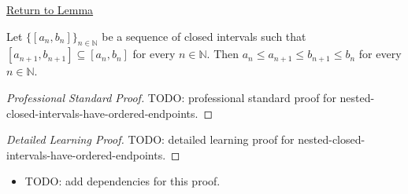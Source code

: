 \newpage
{}
\label{prf:nested-closed-intervals-have-ordered-endpoints}

\begin{remark*}[Return]
\hyperref[lem:nested-closed-intervals-have-ordered-endpoints]{Return to Lemma}
\end{remark*}

\begin{lemma*}
Let $\{[a_n,b_n]\}_{n\in\mathbb N}$ be a sequence of closed intervals such that
$[a_{n+1},b_{n+1}]\subseteq [a_n,b_n]$ for every $n\in\mathbb N$. Then
$a_n\le a_{n+1}\le b_{n+1}\le b_n$ for every $n\in\mathbb N$.
\end{lemma*}

\begin{proof}[Professional Standard Proof]
\LRAProofBodyStart
TODO: professional standard proof for nested-closed-intervals-have-ordered-endpoints.
\end{proof}

\begin{proof}[Detailed Learning Proof]
\LRAProofBodyStart
TODO: detailed learning proof for nested-closed-intervals-have-ordered-endpoints.
\end{proof}

\begin{remark*}
\end{remark*}

\begin{dependencies}
\begin{itemize}
  \item TODO: add dependencies for this proof.
\end{itemize}
\end{dependencies}

\clearpage
